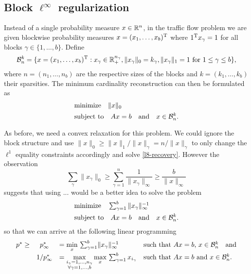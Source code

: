 \documentclass{article} %
\begin{document}
\subsection{Block $\ell^\infty$ regularization}

Instead of a single probability measure $x\in \mathbb{R}^n$, in the traffic
flow problem we are given blockwise probability measures $x = (x_1,
\dots, x_b)^{\rm T}$ where $1^{\rm T} x_\gamma = 1$ for all blocks $\gamma\in
\{1, \dots, b\}$. Define
\begin{equation*}
  \mathcal B_n^k = \{x = (x_1, \dots, x_b)^{\rm T} : x_\gamma \in \mathbb{R}_+^{n_\gamma}, \lVert x_\gamma\rVert_0 = k_\gamma, \lVert x_\gamma\rVert_1 = 1\text{ for $1\leq \gamma\leq b$}\},
\end{equation*}
where $n = (n_1, \dots, n_b)$ are the respective sizes of the blocks
and $k = (k_1, \dots, k_b)$ their sparsities. The minimum cardinality
reconstruction can then be formulated as
\begin{equation}
  \begin{split}
    &\text{minimize}\quad \lVert x\rVert_0\\
    &\text{subject to}\quad Ax = b\quad\text{and}\quad x\in \mathcal B_n^k.
  \end{split}
\end{equation}

As before, we need a convex relaxation for this problem. We could ignore the block structure and use $\|x\|_0 \geq \|x\|_1/ \|x\|_{\gamma} = n/ \|x\|_{\gamma}$ to only change the $\ell^1$ equality constraints accordingly and solve \eqref{l8-recovery}. However the observation
\begin{equation*}
\sum_{\gamma}\|x_{\gamma}\|_0 \geq \sum_{\gamma=1}^n\frac{1}{\|x_{\gamma}\|_{\infty}} \geq \frac{b}{\|x\|_{\infty}}
\end{equation*}
suggests that using ... would be a better idea to solve the problem
\begin{equation}
\label{block-relaxation}
  \begin{split}
    &\text{minimize}\quad \textstyle\sum_{\gamma=1}^b {\lVert x_\gamma\rVert_\infty^{-1}}\\
    &\text{subject to}\quad Ax = b\quad\text{and}\quad x\in \mathcal B_n^k.
  \end{split}
\end{equation}
so that we can arrive at the following linear programming
\begin{equation}\label{block-l8-recovery}
  \begin{array}{rcllllr}
  p^* \geq& p_\infty^* &= \min\limits_x\, \sum_{\gamma = 1}^b\lVert x_{\gamma}\rVert_\infty^{-1}&\text{such that $Ax = b$, $x\in \mathcal B_n^k$}\quad \text{and}\\[5pt]
  &1/p_\infty^* &= \max\limits_{\substack{i_{\gamma} = 1, \dots, n_{\gamma}\\\forall \gamma = 1,\dots, b}} \max\limits_{x}\, \sum_{\gamma=1}^b x_{i_\gamma}&\text{such that $Ax = b$ and $x\in \mathcal B_n^k$.}
  \end{array}
\end{equation} 
\end{document}
